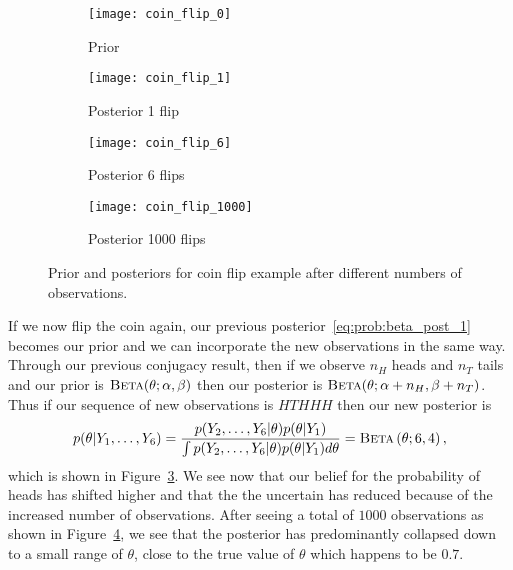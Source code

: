 \begin{figure}[t]
	\centering
	\begin{subfigure}[t]{0.24\textwidth}
		\texttt{[image: coin\_flip\_0]}
		\caption{Prior \label{fig:inf:coin_flip:0}}
	\end{subfigure}
	\begin{subfigure}[t]{0.24\textwidth}
		\texttt{[image: coin\_flip\_1]}
		\caption{Posterior 1 flip \label{fig:inf:coin_flip:1}}
	\end{subfigure}
	\begin{subfigure}[t]{0.24\textwidth}
		\texttt{[image: coin\_flip\_6]}
		\caption{Posterior 6 flips \label{fig:inf:coin_flip:6}}
	\end{subfigure}
	\begin{subfigure}[t]{0.24\textwidth}
		\texttt{[image: coin\_flip\_1000]}
		\caption{Posterior 1000 flips \label{fig:inf:coin_flip:1000}}
	\end{subfigure}
	\caption{Prior and posteriors for coin flip example after different numbers
		of observations.
		\label{fig:inf:coin_flip}}
\end{figure}

If we now flip the coin again, our previous posterior~\eqref{eq:prob:beta_post_1} becomes our
prior and we can incorporate the new observations in the same way.  
Through our previous conjugacy result, then if we observe $n_{H}$ heads
and $n_{T}$ tails and our prior is $\textsc{Beta}(\theta ; \alpha, \beta)$ then our posterior is
$\textsc{Beta}(\theta ; \alpha+n_H, \beta+n_T)$.
Thus if our sequence of new
observations is $HTHHH$ then our new posterior is
\begin{align}
p(\theta | Y_1,\dots,Y_6) = \frac{p(Y_2,\dots,Y_6 | \theta)p(\theta | Y_1)}
{\int p(Y_2,\dots,Y_6 | \theta)p(\theta | Y_1) d\theta} = \textsc{Beta}\left(\theta ; 6,4\right),
\end{align}
which is shown in Figure~\ref{fig:inf:coin_flip:6}.  We see now that our belief for the probability of heads
has shifted higher and that the the uncertain has reduced because of the increased number
of observations.
After seeing a total of $1000$ observations as shown in Figure~\ref{fig:inf:coin_flip:1000}, we
see that the posterior has predominantly collapsed down to a small range of $\theta$,
close to the true value of $\theta$ which happens to be $0.7$.

